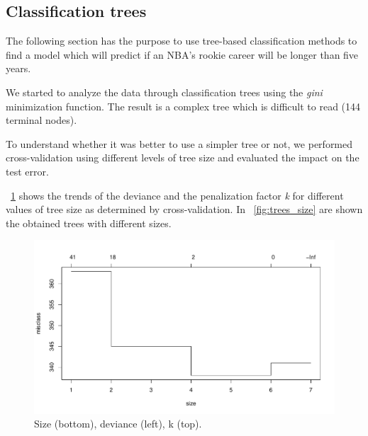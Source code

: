 \subsection{Classification trees}

The following section has the purpose to use tree-based classification methods to find a model which will predict if an NBA's rookie career will be longer than five years.

We started to analyze the data through classification trees using the \textit{gini} minimization function. The result is a complex tree which is difficult to read (144 terminal nodes).

To understand whether it was better to use a simpler tree or not, we performed cross-validation using different levels of tree size and evaluated the impact on the test error.

\Fig~\ref{fig:tree_cv_plot} shows the trends of the deviance and the penalization factor \textit{k} for different values of tree size as determined by cross-validation. In \Fig~\ref{fig:trees_size} are shown the obtained trees with different sizes.

\begin{figure}[H]
	\centering
	\includegraphics[width=0.5\linewidth]{ImageFiles/Classification/Trees/tree_cv_plot.pdf}
	\caption{Size (bottom), deviance (left), k (top).}
	\label{fig:tree_cv_plot}
\end{figure}

